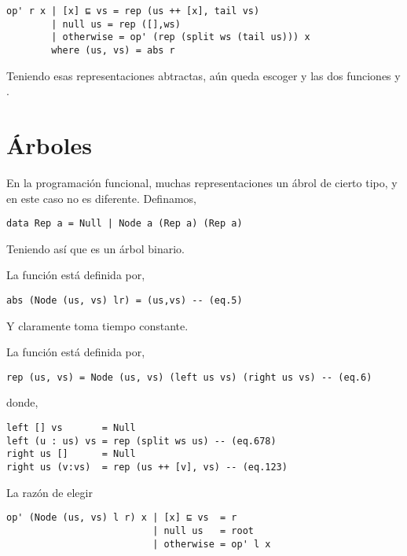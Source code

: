 \begin{verbatim}
op' r x | [x] ⊑ vs = rep (us ++ [x], tail vs)
        | null us = rep ([],ws)
        | otherwise = op' (rep (split ws (tail us))) x
        where (us, vs) = abs r
\end{verbatim}

Teniendo esas representaciones abtractas, aún queda escoger  y las dos funciones  y .


\section{Árboles}
En la programación funcional, muchas representaciones un ábrol de cierto tipo, y en este caso no es diferente. Definamos,

\begin{verbatim}
data Rep a = Null | Node a (Rep a) (Rep a)
\end{verbatim}

Teniendo así que  es un árbol binario.

La función  está definida por,
\begin{verbatim}
abs (Node (us, vs) lr) = (us,vs) -- (eq.5)
\end{verbatim}

Y claramente toma tiempo constante.

La función  está definida por,

\begin{verbatim}
rep (us, vs) = Node (us, vs) (left us vs) (right us vs) -- (eq.6)
\end{verbatim}

donde,

\begin{verbatim}
left [] vs       = Null
left (u : us) vs = rep (split ws us) -- (eq.678)
right us []      = Null
right us (v:vs)  = rep (us ++ [v], vs) -- (eq.123)
\end{verbatim}

La razón de elegir 

\begin{verbatim}
op' (Node (us, vs) l r) x | [x] ⊑ vs  = r
                          | null us   = root
                          | otherwise = op' l x
\end{verbatim}

